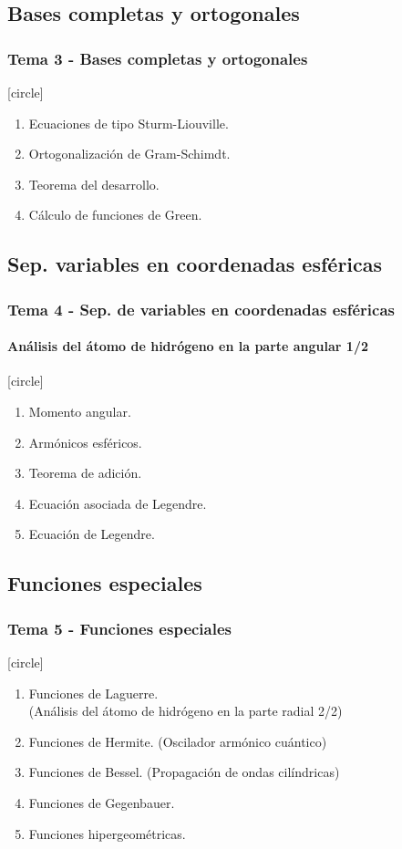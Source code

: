 \subsection{Bases completas y ortogonales}
\begin{frame}
\frametitle{Tema 3 - Bases completas y ortogonales}
[circle]
\begin{enumerate}[<+->]
\item Ecuaciones de tipo Sturm-Liouville.
\item Ortogonalización de Gram-Schimdt.
\item Teorema del desarrollo.
\item Cálculo de funciones de Green.   
\end{enumerate}
\end{frame}
\subsection{Sep. variables en coordenadas esféricas}
\begin{frame}
\frametitle{Tema 4 - Sep. de variables en coordenadas esféricas}
\framesubtitle{Análisis del átomo de hidrógeno en la parte angular 1/2}
[circle]
\begin{enumerate}[<+->]
\item Momento angular.
\item Armónicos esféricos.
\item Teorema de adición.
\item Ecuación asociada de Legendre.
\item Ecuación de Legendre.
\end{enumerate}
\end{frame}
\subsection{Funciones especiales}
\begin{frame}
\frametitle{Tema 5 - Funciones especiales}
[circle]
\begin{enumerate}[<+->]
\item Funciones de Laguerre. \\ (Análisis del átomo de hidrógeno en la parte radial 2/2)
\item Funciones de Hermite. (Oscilador armónico cuántico)
\item Funciones de Bessel. (Propagación de ondas cilíndricas)
\item Funciones de Gegenbauer. 
\item Funciones hipergeométricas.
\end{enumerate}
\end{frame}
